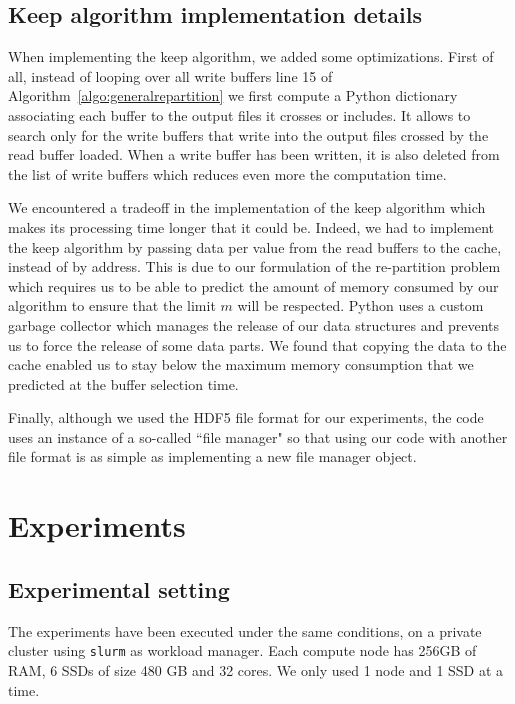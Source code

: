 \documentclass[conference]{IEEEtran}
\begin{document}
\subsection{Keep algorithm implementation details}
When implementing the keep algorithm, we added some optimizations.
First of all, instead of looping over all write buffers line 15 of
Algorithm~\ref{algo:generalrepartition} we first compute a Python dictionary
associating each buffer to the output files it crosses or includes.
It allows to search only for the write buffers that write into the output files
crossed by the read buffer loaded. When a write buffer has been written, it
is also deleted from the list of write buffers which reduces even more the
computation time.

We encountered a tradeoff in the implementation of the keep algorithm which
makes its processing time longer that it could be.
Indeed, we had to implement the keep algorithm by passing data per value from
the read buffers to the cache, instead of by address.
This is due to our formulation of the re-partition problem which requires us to
be able to predict the amount of memory consumed by our algorithm to ensure that
the limit $m$ will be respected.
Python uses a custom garbage collector which manages the release of our
data structures and prevents us to force the release of some data parts.
We found that copying the data to the cache enabled us to stay below the
maximum memory consumption that we predicted at the buffer selection time.

Finally, although we used the HDF5 file format for our experiments, the code
uses an instance of a so-called ``file manager" so that using our code with
another file format is as simple as implementing a new file manager object.

\section{Experiments}

\subsection{Experimental setting}
The experiments have been executed under the same conditions, on a private
cluster using \texttt{slurm} as workload manager. Each compute node has 256GB of
RAM, 6 SSDs of size 480 GB and 32 cores. We only used 1 node and 1 SSD at a
time.
\end{document}
